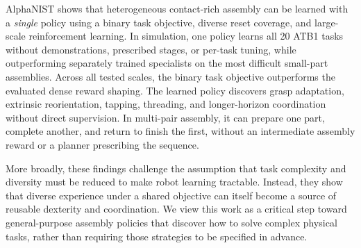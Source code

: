 AlphaNIST shows that heterogeneous contact-rich assembly can be learned with a \emph{single} policy using a binary task objective, diverse reset coverage, and large-scale reinforcement learning.
In simulation, one policy learns all
20 ATB1 tasks without demonstrations, prescribed stages, or per-task tuning, while outperforming separately trained specialists on the most difficult small-part assemblies.
Across all tested scales, the binary task objective outperforms the evaluated dense reward shaping.
The learned policy discovers grasp adaptation, extrinsic reorientation, tapping, threading, and longer-horizon coordination without direct supervision.
In multi-pair assembly, it can prepare one part, complete another, and return to finish the first, without an intermediate assembly reward or a planner prescribing the sequence.





More broadly, these findings challenge the assumption that task complexity and diversity must be reduced to make robot learning tractable. Instead, they show that diverse experience under a shared objective can itself become a source of reusable dexterity and coordination. We view this work as a critical step toward general-purpose assembly policies that discover how to solve complex physical tasks, rather than requiring those strategies to be specified in advance.
